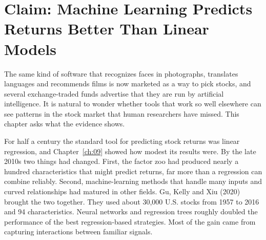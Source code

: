\makeatletter
{}
\makeatother

\makeatletter
\makeatother

\chapter{Claim: Machine Learning Predicts Returns Better Than Linear Models}
\label{ch:20}

The same kind of software that recognizes faces in photographs, translates languages and recommends films is now marketed as a way to pick stocks, and several exchange-traded funds advertise that they are run by artificial intelligence. It is natural to wonder whether tools that work so well elsewhere can see patterns in the stock market that human researchers have missed. This chapter asks what the evidence shows.

For half a century the standard tool for predicting stock returns was linear regression, and Chapter~\ref{ch:09} showed how modest its results were. By the late 2010s two things had changed. First, the factor zoo had produced nearly a hundred characteristics that might predict returns, far more than a regression can combine reliably. Second, machine-learning methods that handle many inputs and curved relationships had matured in other fields. Gu, Kelly and Xiu (2020) brought the two together. They used about 30,000 U.S. stocks from 1957 to 2016 and 94 characteristics. Neural networks and regression trees roughly doubled the performance of the best regression-based strategies. Most of the gain came from capturing interactions between familiar signals.

